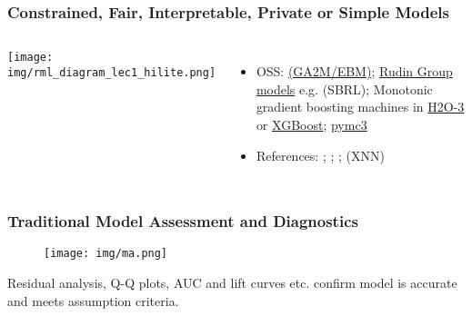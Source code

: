 \documentclass[11pt,
               aspectratio=169,
               hyperref={colorlinks}
               ]{beamer}
\begin{document}
			\begin{frame}
		
				\frametitle{Constrained, Fair, Interpretable, Private or Simple Models}		
			
				\begin{columns}
	
					\centering
	    			\texttt{[image: img/rml\_diagram\_lec1\_hilite.png]}
					\vspace{-5pt}
					\small
					\begin{itemize}
						\item OSS: \href{https://github.com/interpretml/interpret}{ (GA2M/EBM)}; \href{https://users.cs.duke.edu/~cynthia/code.html}{Rudin Group models} e.g.  (SBRL); Monotonic gradient boosting machines in \href{https://github.com/h2oai/h2o-3/blob/master/h2o-py/demos/H2O_tutorial_gbm_monotonicity.ipynb}{H2O-3} or \href{https://xiaoxiaowang87.github.io/monotonicity_constraint/}{XGBoost}; \href{https://docs.pymc.io/}{pymc3}
						\item References: ; ; ;  (XNN)
					\end{itemize}
					\normalsize
				
				\end{columns}			
			
			\end{frame}
	
			\begin{frame}
		
				\frametitle{Traditional Model Assessment and Diagnostics}		
			
				\begin{figure}[htb]
					\begin{center}
						\texttt{[image: img/ma.png]}
					\end{center}
				\end{figure}	

			\vspace{-10pt}
			\scriptsize{Residual analysis, Q-Q plots, AUC and lift curves etc. confirm model is accurate and meets assumption criteria.}
		
			\end{frame}
					
\end{document}
